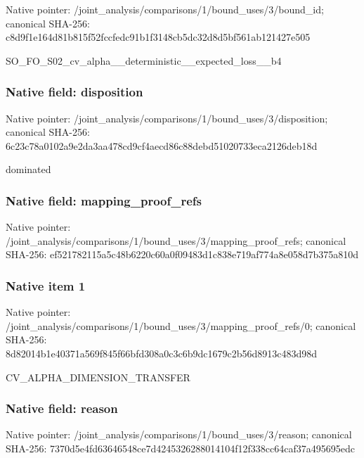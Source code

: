 \documentclass[10pt,a4paper]{article}
\begin{document}
Native pointer: /joint\_analysis/comparis\allowbreak{}ons/1/bound\_uses/3/bound\allowbreak{}\_id; canonical SHA-256: c8d9f1e164d81b815f52fccf\allowbreak{}edc91b1f3148cb5dc32d8d5b\allowbreak{}f561ab121427e505


SO\_FO\_S02\_cv\_alpha\_\_dete\allowbreak{}rministic\_\_expected\_loss\allowbreak{}\_\_b4


\subsubsection{Native field: disposition}


Native pointer: /joint\_analysis/comparis\allowbreak{}ons/1/bound\_uses/3/dispo\allowbreak{}sition; canonical SHA-256: 6c23c78a0102a9e2da3aa478\allowbreak{}cd9cf4aecd86c88debd51020\allowbreak{}733eca2126deb18d


dominated


\subsubsection{Native field: mapping\_proof\_refs}


Native pointer: /joint\_analysis/comparis\allowbreak{}ons/1/bound\_uses/3/mappi\allowbreak{}ng\_proof\_refs; canonical SHA-256: ef521782115a5c48b6220c60\allowbreak{}a0f09483d1c838e719af774a\allowbreak{}8e058d7b375a810d



\subsubsection{Native item 1}


Native pointer: /joint\_analysis/comparis\allowbreak{}ons/1/bound\_uses/3/mappi\allowbreak{}ng\_proof\_refs/0; canonical SHA-256: 8d82014b1e40371a569f845f\allowbreak{}66bfd308a0c3c6b9dc1679c2\allowbreak{}b56d8913c483d98d


CV\_ALPHA\_DIMENSION\_TRANSFER


\subsubsection{Native field: reason}


Native pointer: /joint\_analysis/comparis\allowbreak{}ons/1/bound\_uses/3/reaso\allowbreak{}n; canonical SHA-256: 7370d5e4fd63646548ce7d42\allowbreak{}45326288014104f12f338cc6\allowbreak{}4caf37a495695edc
\end{document}
